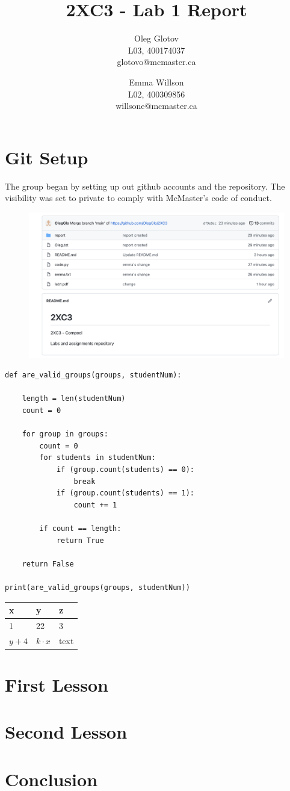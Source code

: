 \documentclass[twocolumn, 10pt]{article}
\title{2XC3 - Lab 1 Report}
\author{Oleg Glotov\\ L03, 400174037\\ glotovo@mcmaster.ca \and Emma Willson\\ L02, 400309856\\ willsone@mcmaster.ca}
\begin{document}
\maketitle
\section{Git Setup}\label{sec:git}
The group began by setting up out github accounts and the repository. The visibility was set to private to comply with McMaster's code of conduct.

\begin{figure}[h]
\includegraphics[width=\linewidth]{img1}
\end{figure}

\footnotesize
\begin{verbatim}
def are_valid_groups(groups, studentNum):

    length = len(studentNum)
    count = 0
    
    for group in groups:
        count = 0
        for students in studentNum:
            if (group.count(students) == 0):
                break
            if (group.count(students) == 1):
                count += 1
        
        if count == length:
            return True
        
    return False

print(are_valid_groups(groups, studentNum))
\end{verbatim}
\normalsize

\begin{center}
\begin{table}[!h]
\begin{tabular}{|l|l|l|}
\hline
x     & y          & z    \\ \hline
1     & 22         & 3    \\ \hline
$y+4$ & $k\cdot x$ & text \\ \hline
\end{tabular}
\end{table}
\end{center}

\section{First Lesson}
\section{Second Lesson}
\section{Conclusion}
\end{document}
